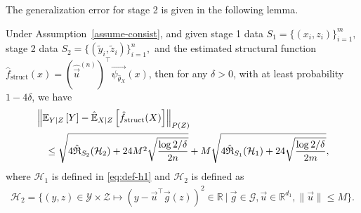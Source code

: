 The generalization error for stage 2 is given in the following lemma.

\begin{lem}\label{lem:2}
    Under Assumption~\ref{assume-consist}, and given stage 1 data $S_1 = \{(x_i, z_i)\}_{i=1}^m,$  stage 2 data $S_2 = \{(\tilde y_i, \tilde z_i)\}_{i=1}^n,$ and the estimated structural function $\hat{f}_{\mathrm{struct}} (x)=(\hat{\vec{u}}^{(n)})^\top \vec{\psi_{\hat{\theta}_X}}(x)$, then for any $\delta>0$, with at least probability $1-4\delta$, we have
    \begin{align*}
        &\left\|\expect[Y|Z]{Y} - \hatexpect[X|Z]{\hat{f}_{\mathrm{struct}}(X)}\right\|_{P(Z)} \\
        &\quad \leq \sqrt{4\hat{\mathfrak{R}}_{S_2}(\mathcal{H}_2) + 24M^2\sqrt{\frac{\log 2/\delta}{2n}}} + M\sqrt{4\hat{\mathfrak{R}}_{S_1}(\mathcal{H}_1) + 24 \sqrt{\frac{\log 2/\delta}{2m}}},
    \end{align*}
    where $\mathcal{H}_1$ is defined in \eqref{eq:def-h1} and $\mathcal{H}_2$ is defined as
    \begin{align}
        \mathcal{H}_2 = \{(y, z) \in \mathcal{Y} \times \mathcal{Z} \mapsto (y -  \vec{u}^\top \vec{g}(z))^2 \in \mathbb{R} ~|~  \vec{g} \in \mathcal{G}, \vec{u} \in \mathbb{R}^{d_1}, \|\vec{u}\| \leq M\}. \label{eq:def-h2}
    \end{align}
\end{lem}

